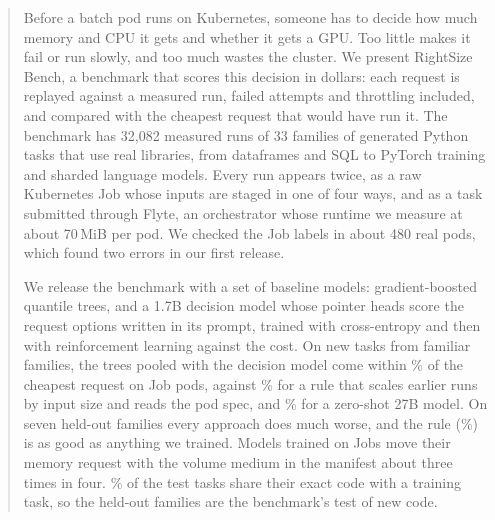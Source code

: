 \begin{abstract}
Before a batch pod runs on Kubernetes, someone has to decide how much memory and CPU it gets and whether
it gets a GPU. Too little makes it fail or run slowly, and too much wastes the cluster. We present
RightSize Bench, a benchmark that scores this decision in dollars: each request is replayed against a
measured run, failed attempts and throttling included, and compared with the cheapest request that would
have run it. The benchmark has 32,082 measured runs of 33 families of generated Python tasks that use real
libraries, from dataframes and SQL to PyTorch training and sharded language models. Every run appears
twice, as a raw Kubernetes Job whose inputs are staged in one of four ways, and as a task submitted
through Flyte, an orchestrator whose runtime we measure at about 70\,MiB per pod. We checked the Job labels
in about 480 real pods, which found two errors in our first release.

We release the benchmark with a set of baseline models: gradient-boosted quantile trees, and a 1.7B
decision model whose pointer heads score the request options written in its prompt, trained with
cross-entropy and then with reinforcement learning against the cost. On new tasks from familiar families,
the trees pooled with the decision model come within \rTestPoolDec\% of the cheapest request on Job pods,
against \rTestSized\% for a rule that scales earlier runs by input size and reads the pod spec, and
\rTestZS\% for a zero-shot 27B model. On seven held-out families every approach does much worse, and the
rule (\rUnseenSized\%) is as good as anything we trained. Models trained on Jobs move their memory request
with the volume medium in the manifest about three times in four. \codeSeenShare\% of the test tasks share
their exact code with a training task, so the held-out families are the benchmark's test of new code.
\end{abstract}
